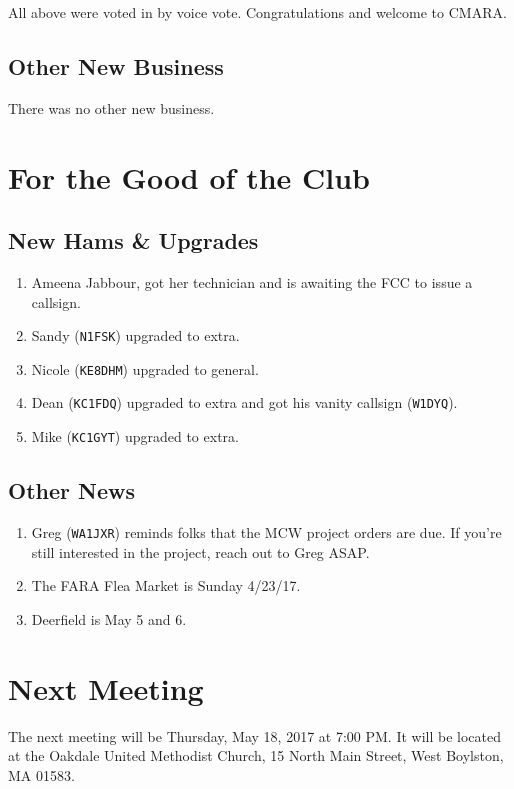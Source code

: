 \documentclass[10pt,letterpaper]{article}
\begin{document}
All above were voted in by voice vote. Congratulations and welcome to CMARA.

\subsection{Other New Business}
There was no other new business.

\section{For the Good of the Club}

\subsection{New Hams \& Upgrades}

\begin{enumerate}
  \item Ameena Jabbour, got her technician and is awaiting the FCC to issue a callsign.
  \item Sandy (\texttt{N1FSK}) upgraded to extra.
  \item Nicole (\texttt{KE8DHM}) upgraded to general.
  \item Dean (\texttt{KC1FDQ}) upgraded to extra and got his vanity callsign (\texttt{W1DYQ}).
  \item Mike (\texttt{KC1GYT}) upgraded to extra.
\end{enumerate}

\subsection{Other News}
\begin{enumerate}
\item Greg (\texttt{WA1JXR}) reminds folks that the MCW project orders are due. If you're still interested in the project, reach out to Greg ASAP.
\item The FARA Flea Market is Sunday 4/23/17.
\item Deerfield is May 5 and 6.
\end{enumerate}

\section{Next Meeting}
The next meeting will be Thursday, May 18, 2017 at 7:00 PM. It will be located at the Oakdale United Methodist Church, 15 North Main Street, West Boylston, MA 01583.\\
\end{document}
